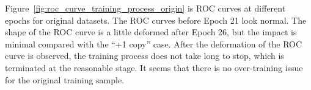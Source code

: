 \documentclass[12pt]{article}
\begin{document}
            Figure~\ref{fig:roc_curve_training_process_origin} is ROC curves at different epochs for original datasets. The ROC curves before Epoch 21 look normal. The shape of the ROC curve is a little deformed after Epoch 26, but the impact is minimal compared with the ``+1 copy'' case. After the deformation of the ROC curve is observed, the training process does not take long to stop, which is terminated at the reasonable stage. It seems that there is no over-training issue for the original training sample.
            \begin{figure}[htpb]
                \centering
                 \\
\end{figure}
\end{document}
